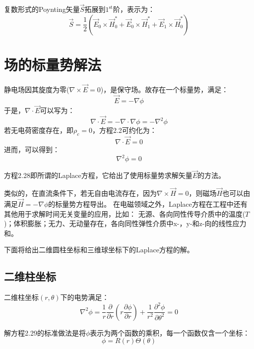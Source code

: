 复数形式的Poynting矢量$\vec{S}$拓展到$\mathrm{1^{st}}$阶，表示为：
\begin{equation}\label{eqn:1st poynting}
\vec{S}=\frac{1}{2}(\vec{E}_0\times \vec{H}_0^*+\vec{E}_0\times \vec{H}_1^*+\vec{E}_1\times \vec{H}_0^*)
\end{equation}

\section{场的标量势解法}
静电场因其旋度为零($\nabla \times \vec{E}=0$)，是保守场。故存在一个标量势，满足：
\begin{equation}
  \vec{E}=-\nabla \phi
\end{equation}
于是，$\nabla\cdot\vec{E}$可以写为：
\begin{equation}
  \nabla\cdot\vec{E}=-\nabla\cdot\nabla\phi=-\nabla^2\phi
\end{equation}
若无电荷密度存在，即$\rho_c=0$，方程2.2可约化为：
\begin{equation}
  \nabla\cdot\vec{E}=0
\end{equation}
进而，可以得到：
\begin{equation}
\nabla^2\phi=0
\end{equation}

方程2.28即所谓的Laplace方程，它给出了使用标量势求解矢量$\vec{E}$的方法。

类似的，在直流条件下，若无自由电流存在，因为$\nabla\times \vec{H}=0$，则磁场$\vec{H}$也可以由满足$\vec{H}=-\nabla \phi$的标量势方程导出。
在电磁领域之外，Laplace方程在工程中还有其他用于求解时间无关变量的应用，比如：
无源、各向同性传导介质中的温度($T$)；体积膨胀；无力、无动量存在，各向同性弹性介质中x-，y-和z-向的线性应力和。

下面将给出二维圆柱坐标和三维球坐标下的Laplace方程的解。
\subsection{二维柱坐标}
二维柱坐标$(r,\theta)$下的电势满足：
\begin{equation}
  \nabla^2\phi = \frac{1}{r}\frac{\partial}{\partial r}(r\frac{\partial \phi}{\partial r})+\frac{1}{r^2}\frac{\partial^2\phi}{\partial\theta^2}=0
\end{equation}

解方程2.29的标准做法是将$\phi$表示为两个函数的乘积，每一个函数仅含一个坐标：
\begin{equation}
  \phi=R(r)\Theta(\theta)
\end{equation}


